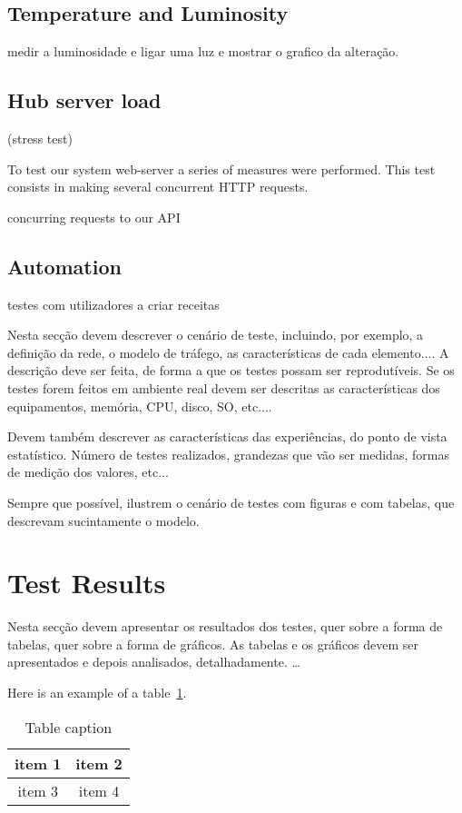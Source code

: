 \subsection{Temperature and Luminosity}

medir a luminosidade e ligar uma luz e mostrar o grafico da alteração.


\subsection{Hub server load}

(stress test)

To test our system web-server a series of measures were performed. This test consists in making several concurrent \ac{HTTP} requests.

 concurring requests to our \ac{API} 


\subsection{Automation}
testes com utilizadores a criar receitas



Nesta secção devem descrever o cenário de teste, incluindo, por exemplo, a
definição da rede, o modelo de tráfego, as características de cada elemento....
A descrição deve ser feita, de forma a que os testes possam ser reprodutíveis.
Se os testes forem feitos em ambiente real devem ser descritas as características
dos equipamentos, memória, CPU, disco, SO, etc....

Devem também descrever as características das experiências, do ponto de vista
estatístico. Número de testes realizados, grandezas que vão ser medidas, formas de
medição dos valores, etc...

Sempre que possível, ilustrem o cenário de testes com figuras e com tabelas, que
descrevam sucintamente o modelo.

\section{Test Results}
Nesta secção devem apresentar os resultados dos testes, quer sobre a forma
de tabelas, quer sobre a forma de gráficos. As tabelas e os gráficos devem ser
apresentados e depois analisados, detalhadamente.
\ldots

Here is an example of a table~\ref{table:simple}.

\begin{table}[!htb]
  \begin{center}
  \caption[Table caption shown in TOC]{Table caption}
    \begin{tabular}{|c|c|}
      \hline
      item 1 & item 2 \\
      \hline
      item 3 & item 4 \\
      \hline
    \end{tabular}
  \end{center}
  \label{table:simple}
\end{table}
